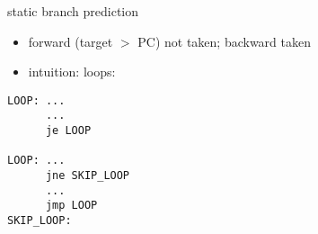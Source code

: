 \begin{frame}[fragile,label=staticPredict]{static branch prediction}
\begin{itemize}
\item forward (target $>$ PC) not taken; backward taken
\item intuition: loops:
\end{itemize}
\begin{lstlisting}[style=small]
LOOP: ...
      ...
      je LOOP

LOOP: ...
      jne SKIP_LOOP
      ...
      jmp LOOP
SKIP_LOOP:
\end{lstlisting} 
\end{frame}

